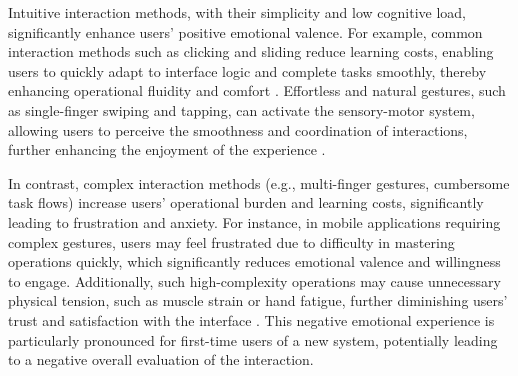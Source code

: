 Intuitive interaction methods, with their simplicity and low cognitive load, significantly enhance users’ positive emotional valence. For example, common interaction methods such as clicking and sliding reduce learning costs, enabling users to quickly adapt to interface logic and complete tasks smoothly, thereby enhancing operational fluidity and comfort \cite{sundar2014user}. Effortless and natural gestures, such as single-finger swiping and tapping, can activate the sensory-motor system, allowing users to perceive the smoothness and coordination of interactions, further enhancing the enjoyment of the experience \cite{wodehouse2014exploring}.

In contrast, complex interaction methods (e.g., multi-finger gestures, cumbersome task flows) increase users’ operational burden and learning costs, significantly leading to frustration and anxiety. For instance, in mobile applications requiring complex gestures, users may feel frustrated due to difficulty in mastering operations quickly, which significantly reduces emotional valence and willingness to engage. Additionally, such high-complexity operations may cause unnecessary physical tension, such as muscle strain or hand fatigue, further diminishing users’ trust and satisfaction with the interface \cite{wodehouse2014exploring}. This negative emotional experience is particularly pronounced for first-time users of a new system, potentially leading to a negative overall evaluation of the interaction.

